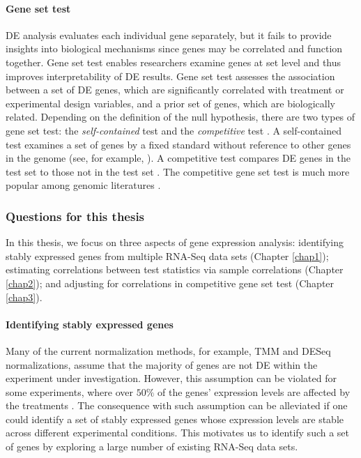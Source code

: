 \paragraph*{Gene set test}
DE analysis evaluates each individual gene separately, but it fails to provide insights into
biological mechanisms since genes may be correlated and function together.  Gene set test enables
researchers examine genes at set level and thus improves interpretability of DE results. Gene set
test assesses the association between a set of DE genes, which are significantly correlated with
treatment or experimental design variables, and a prior set of genes, which are biologically
related. Depending on the definition of the null hypothesis, there are two types of gene set test:
the \textit{self-contained} test and the \textit{competitive} test \citep{goeman2007analyzing}. A
self-contained test examines a set of genes by a fixed standard without reference to other genes in
the genome (see, for example, \cite{goeman2004global,goeman2005testing, huang2013gene,
	tsai2009multivariate, wu2010roast}). A competitive test compares DE
genes in the test set to those not in the test set
\citep{tian2005discovering,wu2012camera,yaari2013quantitative}. The competitive gene set test is
much more popular among genomic literatures \citep{gatti2010heading,goeman2007analyzing}.  




\subsubsection{Questions for this thesis}
In this thesis, we focus on three aspects of gene expression analysis: identifying stably
expressed genes from multiple RNA-Seq data sets (Chapter \ref{chap1}); estimating correlations
between test statistics via sample
correlations (Chapter \ref{chap2}); and adjusting for correlations in competitive gene set test
(Chapter \ref{chap3}).

\paragraph{Identifying stably expressed genes}
Many of the current normalization methods, for example, TMM \citep{robinson2010scaling} and DESeq
\citep{anders2010differential} normalizations, assume that the majority of genes are not DE within
the experiment under investigation. However, this assumption can be violated for some experiments,
where over $50\%$ of the genes' expression levels are affected by the treatments
\citep{loven2012revisiting, wu2013use}. The consequence with such assumption can be alleviated if
one could identify a set of stably expressed genes whose expression levels are stable across
different experimental conditions. This motivates us to identify such a set of genes by exploring a
large number of existing RNA-Seq data sets.

